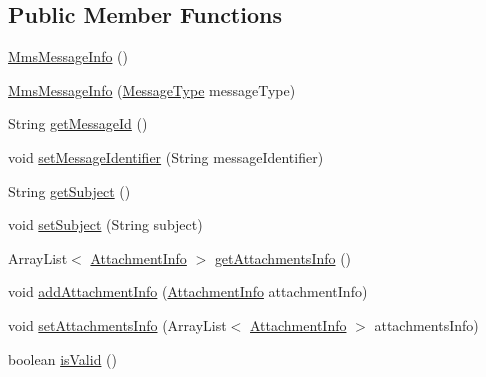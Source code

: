 \subsection*{Public Member Functions}
\begin{DoxyCompactItemize}
\item 
\hyperlink{classcom_1_1bluevia_1_1messagery_1_1mo_1_1mms_1_1data_1_1MmsMessageInfo_aa62764e1f424cdd39bf6bf098edc9c5e}{MmsMessageInfo} ()
\item 
\hyperlink{classcom_1_1bluevia_1_1messagery_1_1mo_1_1mms_1_1data_1_1MmsMessageInfo_ab44680701f8ded1f1166c7f5ecfe55b0}{MmsMessageInfo} (\hyperlink{classcom_1_1telefonica_1_1schemas_1_1unica_1_1rest_1_1mms_1_1v1_1_1MessageType}{MessageType} messageType)
\item 
String \hyperlink{classcom_1_1bluevia_1_1messagery_1_1mo_1_1mms_1_1data_1_1MmsMessageInfo_a4d9086ceb7084a03335590a79b04ecfb}{getMessageId} ()
\item 
void \hyperlink{classcom_1_1bluevia_1_1messagery_1_1mo_1_1mms_1_1data_1_1MmsMessageInfo_a725877c94661c70c0bb1d4e581a59c8c}{setMessageIdentifier} (String messageIdentifier)
\item 
String \hyperlink{classcom_1_1bluevia_1_1messagery_1_1mo_1_1mms_1_1data_1_1MmsMessageInfo_a6729650d07279c80459f6980bb3cd107}{getSubject} ()
\item 
void \hyperlink{classcom_1_1bluevia_1_1messagery_1_1mo_1_1mms_1_1data_1_1MmsMessageInfo_a255772ed550ef38829d7022739e7edf8}{setSubject} (String subject)
\item 
ArrayList$<$ \hyperlink{classcom_1_1bluevia_1_1messagery_1_1mo_1_1mms_1_1data_1_1MmsMessageInfo_1_1AttachmentInfo}{AttachmentInfo} $>$ \hyperlink{classcom_1_1bluevia_1_1messagery_1_1mo_1_1mms_1_1data_1_1MmsMessageInfo_a8cfd5c4c77922ef5ef0a8df8fb7edcad}{getAttachmentsInfo} ()
\item 
void \hyperlink{classcom_1_1bluevia_1_1messagery_1_1mo_1_1mms_1_1data_1_1MmsMessageInfo_a51bd7e663fb86479ce119f399b4b7349}{addAttachmentInfo} (\hyperlink{classcom_1_1bluevia_1_1messagery_1_1mo_1_1mms_1_1data_1_1MmsMessageInfo_1_1AttachmentInfo}{AttachmentInfo} attachmentInfo)
\item 
void \hyperlink{classcom_1_1bluevia_1_1messagery_1_1mo_1_1mms_1_1data_1_1MmsMessageInfo_a4205829cba72cd72978cfa64d3a56b9b}{setAttachmentsInfo} (ArrayList$<$ \hyperlink{classcom_1_1bluevia_1_1messagery_1_1mo_1_1mms_1_1data_1_1MmsMessageInfo_1_1AttachmentInfo}{AttachmentInfo} $>$ attachmentsInfo)
\item 
boolean \hyperlink{classcom_1_1bluevia_1_1messagery_1_1mo_1_1mms_1_1data_1_1MmsMessageInfo_ae1acda88d6cb6fddd46602eb752c470c}{isValid} ()
\end{DoxyCompactItemize}



